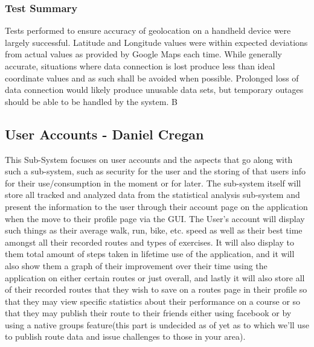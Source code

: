\documentclass{article}
\begin{document}
\subsubsection{Test Summary}
Tests performed to ensure accuracy of geolocation on a handheld device were largely successful. Latitude and Longitude values were within expected deviations from actual values as provided by Google Maps each time. While generally accurate, situations where data connection is lost produce less than ideal coordinate values and as such shall be avoided when possible. Prolonged loss of data connection would likely produce unusable data sets, but temporary outages should be able to be handled by the system.
B
\pagebreak

\subsection{User Accounts - Daniel Cregan}
This Sub-System focuses on user accounts and the aspects that go along with such a sub-system, such as security for the user and the storing of that users info for their use/consumption in the moment or for later.
The sub-system itself will store all tracked and analyzed data from the statistical analysis sub-system and present the information to the user through their account page on the application when the move to their profile page via the GUI. The User's account will display such things as their average walk, run, bike, etc. speed as well as their best time amongst all their recorded routes and types of exercises. It will also display to them total amount of steps taken in lifetime use of the application, and it will also show them a graph of their improvement over their time using the application on either certain routes or just overall, and lastly it will also store all of their recorded routes that they wish to save on a routes page in their profile so that they may view specific statistics about their performance on a course or so that they may publish their route to their friends either using facebook or by using a native groups feature(this part is undecided as of yet as to which we’ll use to publish route data and issue challenges to those in your area).
\end{document}

